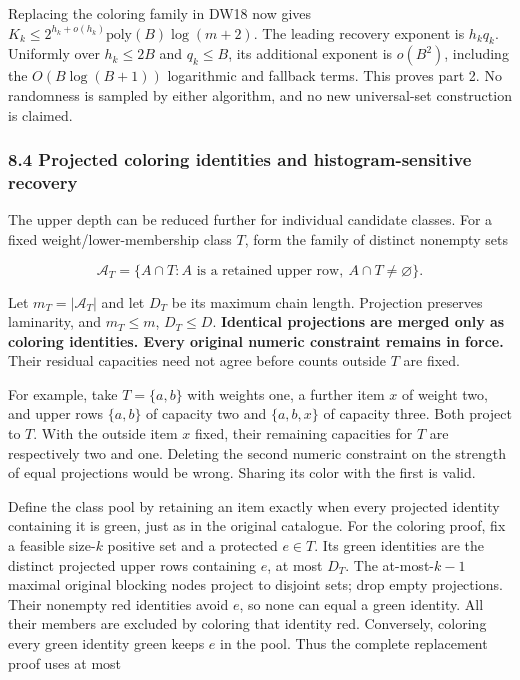 Replacing the coloring family in DW18 now gives \(K_k\le2^{h_k+o(h_k)}\mathrm{poly}(B)\log(m+2)\). The leading recovery exponent is \(h_k q_k\). Uniformly over \(h_k\le2B\) and \(q_k\le B\), its additional exponent is \(o(B^2)\), including the \(O(B\log(B+1))\) logarithmic and fallback terms. This proves part 2. No randomness is sampled by either algorithm, and no new universal-set construction is claimed.

\hypertarget{af-fe230a140d-projected-coloring-identities-and-histogram-sensitive-recovery}{%
\subsubsection{8.4 Projected coloring identities and histogram-sensitive recovery}\label{af-fe230a140d-projected-coloring-identities-and-histogram-sensitive-recovery}}

The upper depth can be reduced further for individual candidate classes. For a fixed weight/lower-membership class \(T\), form the family of distinct nonempty sets

\[
\mathcal A_T=\{A\cap T:A\text{ is a retained upper row},\ A\cap T\ne\varnothing\}.
\tag{DW21}
\]

Let \(m_T=|\mathcal A_T|\) and let \(D_T\) be its maximum chain length. Projection preserves laminarity, and \(m_T\le m\), \(D_T\le D\). \textbf{Identical projections are merged only as coloring identities. Every original numeric constraint remains in force.} Their residual capacities need not agree before counts outside \(T\) are fixed.

For example, take \(T=\{a,b\}\) with weights one, a further item \(x\) of weight two, and upper rows \(\{a,b\}\) of capacity two and \(\{a,b,x\}\) of capacity three. Both project to \(T\). With the outside item \(x\) fixed, their remaining capacities for \(T\) are respectively two and one. Deleting the second numeric constraint on the strength of equal projections would be wrong. Sharing its color with the first is valid.

Define the class pool by retaining an item exactly when every projected identity containing it is green, just as in the original catalogue. For the coloring proof, fix a feasible size-\(k\) positive set and a protected \(e\in T\). Its green identities are the distinct projected upper rows containing \(e\), at most \(D_T\). The at-most-\(k-1\) maximal original blocking nodes project to disjoint sets; drop empty projections. Their nonempty red identities avoid \(e\), so none can equal a green identity. All their members are excluded by coloring that identity red. Conversely, coloring every green identity green keeps \(e\) in the pool. Thus the complete replacement proof uses at most

